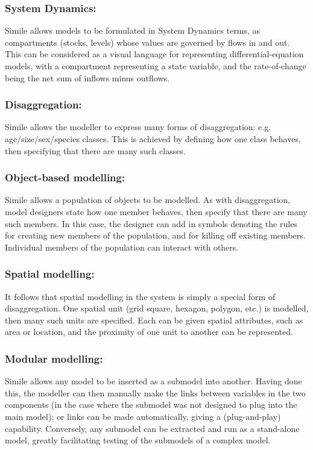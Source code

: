 	\subsubsection{System Dynamics:}
Simile allows models to be formulated in System Dynamics terms, as compartments (stocks, levels) whose values are governed by flows in and out. This can be considered as a visual language for representing differential-equation models, with a compartment representing a state variable, and the rate-of-change being the net sum of inflows minus outflows.
	\subsubsection{Disaggregation:}
Simile allows the modeller to express many forms of disaggregation: e.g. age/size/sex/species classes. This is achieved by defining how one class behaves, then specifying that there are many such classes.
	\subsubsection{Object-based modelling:}
Simile allows a population of objects to be modelled. As with disaggregation, model designers state how one member behaves, then specify that there are many such members. In this case, the designer can add in symbols denoting the rules for creating new members of the population, and for killing off existing members. Individual members of the population can interact with others.
	\subsubsection{Spatial modelling:}
It follows that spatial modelling in the system is simply a special form of disaggregation. One spatial unit (grid square, hexagon, polygon, etc.) is modelled, then many such units are specified. Each can be given spatial attributes, such as area or location, and the proximity of one unit to another can be represented.
	\subsubsection{Modular modelling:}
Simile allows any model to be inserted as a submodel into another. Having done this, the modeller can then manually make the links between variables in the two components (in the case where the submodel was not designed to plug into the main model); or links can be made automatically, giving a (plug-and-play) capability. Conversely, any submodel can be extracted and run as a stand-alone model, greatly facilitating testing of the submodels of a complex model.
